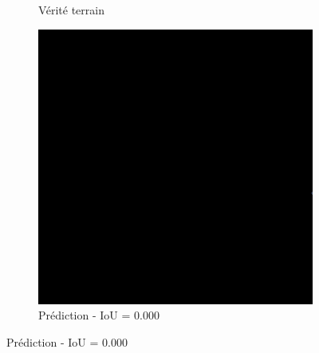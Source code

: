 \begin{figure}[H]
\begin{subfigure}{0.32\textwidth}
    \caption{Vérité terrain}
\end{subfigure}
\hfill
\begin{subfigure}{0.32\textwidth}
    \includegraphics[width=\textwidth]{02-main//figures/ch4/kfold_ensembles/unetplusplus_tu-efficientnetv2_rw_s.ra2_in1k/worst_cases/worst_2_iou0.000_24951112_tile_4_13_2bd653_overlay_pred.png}
    \caption{Prédiction - IoU = 0.000}
\end{subfigure}

\vspace{0.35cm}


\end{figure}
